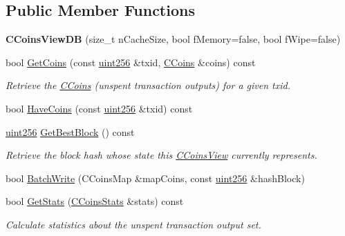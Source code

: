 \subsection*{Public Member Functions}
\begin{DoxyCompactItemize}
\item 
\mbox{\label{class_c_coins_view_d_b_a209841b241febcccb2ec584b886ad374}} 
{\bfseries C\+Coins\+View\+DB} (size\+\_\+t n\+Cache\+Size, bool f\+Memory=false, bool f\+Wipe=false)
\item 
\mbox{\label{class_c_coins_view_d_b_ac35a80d1115ec697101d382e71db5b31}} 
bool \mbox{\hyperlink{class_c_coins_view_d_b_ac35a80d1115ec697101d382e71db5b31}{Get\+Coins}} (const \mbox{\hyperlink{classuint256}{uint256}} \&txid, \mbox{\hyperlink{class_c_coins}{C\+Coins}} \&coins) const
\begin{DoxyCompactList}\small\item\em Retrieve the \mbox{\hyperlink{class_c_coins}{C\+Coins}} (unspent transaction outputs) for a given txid. \end{DoxyCompactList}\item 
bool \mbox{\hyperlink{class_c_coins_view_d_b_af55f35faadeb74b5406559fe3ed20114}{Have\+Coins}} (const \mbox{\hyperlink{classuint256}{uint256}} \&txid) const
\item 
\mbox{\label{class_c_coins_view_d_b_ac9c513a34b9e58d942fdbeafd9e5bbce}} 
\mbox{\hyperlink{classuint256}{uint256}} \mbox{\hyperlink{class_c_coins_view_d_b_ac9c513a34b9e58d942fdbeafd9e5bbce}{Get\+Best\+Block}} () const
\begin{DoxyCompactList}\small\item\em Retrieve the block hash whose state this \mbox{\hyperlink{class_c_coins_view}{C\+Coins\+View}} currently represents. \end{DoxyCompactList}\item 
bool \mbox{\hyperlink{class_c_coins_view_d_b_a33f98ec9323ce48e1704327bc8a2a002}{Batch\+Write}} (C\+Coins\+Map \&map\+Coins, const \mbox{\hyperlink{classuint256}{uint256}} \&hash\+Block)
\item 
\mbox{\label{class_c_coins_view_d_b_a227bf56f8801921f12e56c6839104fce}} 
bool \mbox{\hyperlink{class_c_coins_view_d_b_a227bf56f8801921f12e56c6839104fce}{Get\+Stats}} (\mbox{\hyperlink{struct_c_coins_stats}{C\+Coins\+Stats}} \&stats) const
\begin{DoxyCompactList}\small\item\em Calculate statistics about the unspent transaction output set. \end{DoxyCompactList}\end{DoxyCompactItemize}
